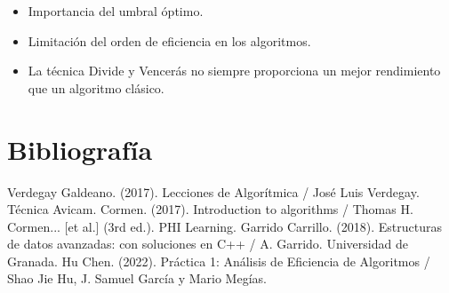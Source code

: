 \documentclass[13pt]{beamer}
\begin{document}
    \begin{frame}
        \begin{itemize}
            \item Importancia del umbral óptimo.
            \item Limitación del orden de eficiencia en los algoritmos.
            \item La técnica Divide y Vencerás no siempre proporciona un mejor rendimiento que un algoritmo clásico. 
        \end{itemize}
    \end{frame}


    \section{Bibliografía}

    \begin{frame}
        \begin{thebibliography}{0}
             Verdegay Galdeano. (2017). Lecciones de Algorítmica / José Luis Verdegay. Técnica Avicam.
             Cormen. (2017). Introduction to algorithms / Thomas H. Cormen... [et al.] (3rd ed.). PHI Learning.
             Garrido Carrillo. (2018). Estructuras de datos avanzadas: con soluciones en C++ / A. Garrido. Universidad de Granada.        
             Hu Chen. (2022). Práctica 1: Análisis de Eficiencia de Algoritmos / Shao Jie Hu, J. Samuel García y Mario Megías.      
        \end{thebibliography}
    \end{frame}
\end{document}
